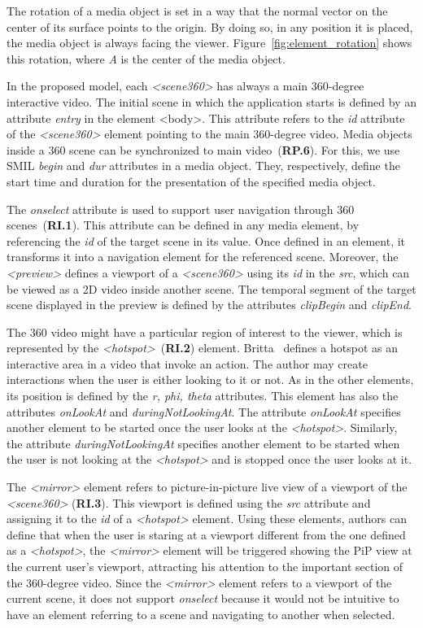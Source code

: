 The rotation of a media object is set in a
way that the normal vector on the center of its surface points to the origin.
By doing so, in any position it is placed, the media object is always facing the viewer.
Figure~\ref{fig:element_rotation} shows this rotation, where \emph{A} is the
center of the media object.

In the proposed model, each \emph{<scene360>} has always a main 360-degree
interactive video. 
The initial scene in which the application starts is defined by an attribute
\emph{entry} in the element <body>. 
This attribute refers to the \emph{id} attribute of the \emph{<scene360>}
element pointing to the main 360-degree video. 
Media objects inside a 360 scene can be synchronized to main video~(\textbf{RP.6}).
For this, we use SMIL \emph{begin} and \emph{dur} attributes in a media
object.
They, respectively, define the start time and duration for the presentation of
the specified media object.

The \emph{onselect} attribute is used to support user navigation through 360
scenes~(\textbf{RI.1}).
This attribute can be defined in any media element, by referencing the
\emph{id} of the target scene in its value.
Once defined in an element, it transforms it into a navigation element for the
referenced scene.
Moreover, the \emph{<preview>} defines a viewport of a \emph{<scene360>} using
its \emph{id} in the \emph{src}, which can be viewed as a 2D video inside
another scene.
The temporal segment of the target scene displayed in the preview is defined
by the attributes \emph{clipBegin} and \emph{clipEnd}. 

The 360 video might have a particular region of interest to the viewer, which
is represented by the \emph{<hotspot>}~(\textbf{RI.2}) element.
Britta~\cite{Britta2017} defines a hotspot as an interactive area in a video
that invoke an action.
The author may create interactions when the user is either looking to it or
not.
As in the other elements, its position is defined by the \emph{r, phi, theta}
attributes. 
This element has also the attributes \emph{onLookAt} and
\emph{duringNotLookingAt}.
The attribute \emph{onLookAt} specifies another element to be started once the
user looks at the \emph{<hotspot>}.
Similarly, the attribute \emph{duringNotLookingAt} specifies another
element to be started when the user is not looking at the \emph{<hotspot>} and
is stopped once the user looks at it.

The \emph{<mirror>} element refers to picture-in-picture live view of a
viewport of the \emph{<scene360>} (\textbf{RI.3}).
This viewport is defined using the \emph{src} attribute and assigning it to
the \emph{id} of a \emph{<hotspot>} element.
Using these elements, authors can define that when the user is staring at a
viewport different from the one defined as a \emph{<hotspot>}, the
\emph{<mirror>} element will be triggered showing the PiP view at the current
user's viewport, attracting his attention to the important section of the
360-degree video.
Since the \emph{<mirror>} element refers to a viewport of the current scene,
it does not support \emph{onselect} because it would not be intuitive to have
an element referring to a scene and navigating to another when selected.


